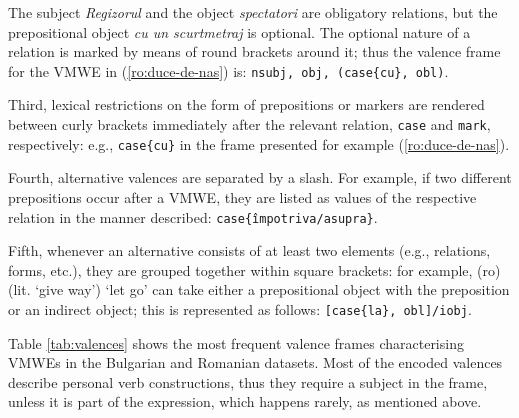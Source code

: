 \documentclass[output=paper,colorlinks,citecolor=brown]{langscibook}
\begin{document}
The subject \textit{Regizorul} and the object \textit{spectatori} are  obligatory relations, but the prepositional object \textit{cu un scurtmetraj} is optional. The optional nature of a relation is marked by means of round brackets around it; thus the valence frame for the VMWE in (\ref{ro:duce-de-nas}) is: \texttt{nsubj, obj, (case\{cu\}, obl)}.  

Third, lexical restrictions on the form of prepositions or markers are rendered between curly brackets immediately after the relevant relation, \texttt{case} and \texttt{mark}, respectively: e.g., \texttt{case\{cu\}} in the frame presented for example (\ref{ro:duce-de-nas}).

Fourth, alternative valences are separated by a slash. For example, if two different prepositions occur after a VMWE, they are listed as values of the respective relation in the manner described: \texttt{case\{împotriva/asupra\}}.

Fifth, whenever an alternative consists of at least two elements (e.g., relations, forms, etc.), they are grouped together within square brackets: for example, (ro)  (lit. `give way') {`let go'} can take either a prepositional object with the preposition  or an indirect object; this is represented as follows: \texttt{[case\{la\}, obl]/iobj}.\largerpage

Table \ref{tab:valences} shows the most frequent valence frames characterising VMWEs in the Bulgarian and Romanian datasets.
Most of the encoded valences describe personal verb constructions, thus they require a subject in the frame, unless it is part of the expression, which happens rarely, as mentioned above.
\end{document}
